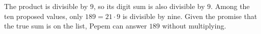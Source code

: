 The product is divisible by $9$, so its digit sum is also divisible by $9$. Among the ten proposed values, only $189=21\cdot9$ is divisible by nine. Given the promise that the true sum is on the list, Pepem can answer $\boxed{189}$ without multiplying.
